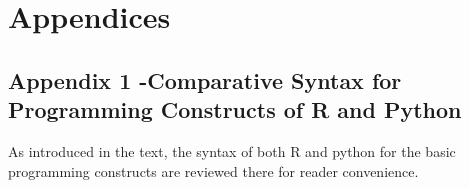 \documentclass[]{book}
\theoremstyle{definition}
\theoremstyle{definition}
\theoremstyle{definition}
\theoremstyle{remark}
\begin{document}
\part{Appendices}\label{part-appendices}

\chapter{Appendix 1 -Comparative Syntax for Programming Constructs of R
and
Python}\label{appendix-1--comparative-syntax-for-programming-constructs-of-r-and-python}

  

As introduced in the text, the syntax of both R and python for the basic
programming constructs are reviewed there for reader convenience.

  
\end{document}
